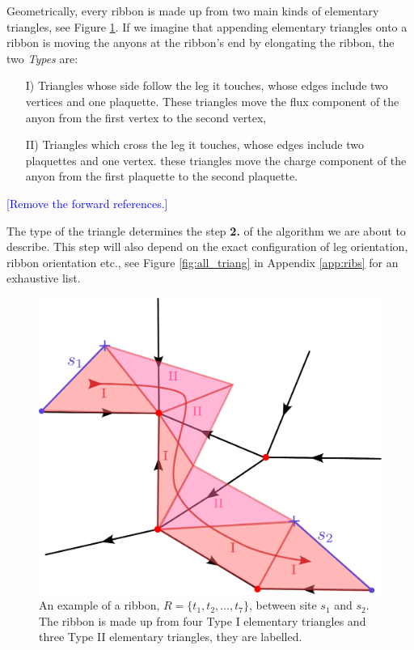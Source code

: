\documentclass[two column]{article}
\newcommand{\jovan}[1]{\textcolor{blue}{[#1]}}
\begin{document}
Geometrically, every ribbon is made up from two main kinds of elementary triangles, see Figure \ref{fig:rib_exampl}. If we imagine that appending elementary triangles onto a ribbon is moving the anyons at the ribbon's end by elongating the ribbon, the two \textit{Types} are:\begin{itemize}
    \item[I)] Triangles whose side follow the leg it touches, whose edges include two vertices and one plaquette. These triangles move the flux component of the anyon from the first vertex to the second vertex,
    \item[II)] Triangles which cross the leg it touches, whose edges include two plaquettes and one vertex. these triangles move the charge component of the anyon from the first plaquette to the second plaquette.
\end{itemize}

\jovan{Remove the forward references.}

The type of the triangle determines the step \textbf{2.} of the algorithm we are about to describe. This step will also depend on the exact configuration of leg orientation, ribbon orientation etc., see Figure \ref{fig:all_triang} in Appendix \ref{app:ribs} for an exhaustive list.


\begin{figure}
    \centering
    \includegraphics[width= \linewidth]{Figures/ribbon_exmpl.pdf}
    \caption{An example of a ribbon, $R = \{t_1, t_2, \ldots, t_7\}$, between site $s_1$ and $s_2$. The ribbon is made up from four Type I elementary triangles and three Type II elementary triangles, they are labelled.}
    \label{fig:rib_exampl}
\end{figure}
\end{document}
